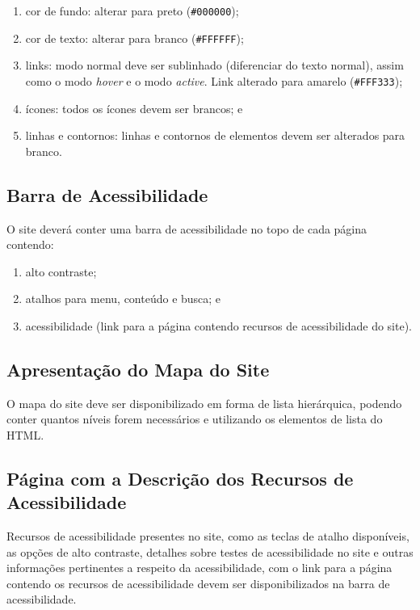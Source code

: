 \documentclass[
  12pt,
  openright,
  twoside,
  a4paper,
  english,
  french,
  spanish,
  brazil
]{abntex2}
\begin{document}
\begin{enumerate}
  \item cor de fundo: alterar para preto (\texttt{\#000000});
  \item cor de texto: alterar para branco (\texttt{\#FFFFFF});
  \item
    links: modo normal deve ser sublinhado (diferenciar do texto normal), assim
    como o modo \textit{hover} e o modo \textit{active}. Link alterado para
    amarelo (\texttt{\#FFF333});
  \item ícones: todos os ícones devem ser brancos; e
  \item
    linhas e contornos: linhas e contornos de elementos devem ser alterados para
    branco.
\end{enumerate}

\subsection{Barra de Acessibilidade}

O site deverá conter uma barra de acessibilidade no topo de cada página
contendo:

\begin{enumerate}
  \item alto contraste;
  \item atalhos para menu, conteúdo e busca; e
  \item
    acessibilidade (link para a página contendo recursos de acessibilidade do
    site).
\end{enumerate}

\subsection{Apresentação do Mapa do Site}

O mapa do site deve ser disponibilizado em forma de lista hierárquica, podendo
conter quantos níveis forem necessários e utilizando os elementos de lista do
HTML.

\subsection{Página com a Descrição dos Recursos de Acessibilidade}

Recursos de acessibilidade presentes no site, como as teclas de atalho
disponíveis, as opções de alto contraste, detalhes sobre testes de
acessibilidade no site e outras informações pertinentes a respeito da
acessibilidade, com o link para a página contendo os recursos de acessibilidade
devem ser disponibilizados na barra de acessibilidade.
\end{document}
